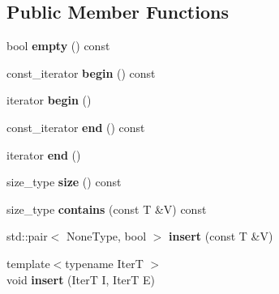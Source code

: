 \subsection*{Public Member Functions}
\begin{DoxyCompactItemize}
\item 
\hypertarget{classutil_1_1small__set_a2272cffd8ba98e11269718fe274482cf}{bool {\bfseries empty} () const }\label{classutil_1_1small__set_a2272cffd8ba98e11269718fe274482cf}

\item 
\hypertarget{classutil_1_1small__set_af4da233dcdf5e184c1a97f410b92fa6c}{const\+\_\+iterator {\bfseries begin} () const }\label{classutil_1_1small__set_af4da233dcdf5e184c1a97f410b92fa6c}

\item 
\hypertarget{classutil_1_1small__set_a825b210881040305859a6504b8770bb4}{iterator {\bfseries begin} ()}\label{classutil_1_1small__set_a825b210881040305859a6504b8770bb4}

\item 
\hypertarget{classutil_1_1small__set_a08e7d4d4897f4e96f3cb741b80bd02bc}{const\+\_\+iterator {\bfseries end} () const }\label{classutil_1_1small__set_a08e7d4d4897f4e96f3cb741b80bd02bc}

\item 
\hypertarget{classutil_1_1small__set_ab739363d0dbb33dd957291e50034ef11}{iterator {\bfseries end} ()}\label{classutil_1_1small__set_ab739363d0dbb33dd957291e50034ef11}

\item 
\hypertarget{classutil_1_1small__set_ab8326762cc9700099f26cd867c9702ce}{size\+\_\+type {\bfseries size} () const }\label{classutil_1_1small__set_ab8326762cc9700099f26cd867c9702ce}

\item 
\hypertarget{classutil_1_1small__set_a787ddf15981a3a1b8096151188f52a8f}{size\+\_\+type {\bfseries contains} (const T \&V) const }\label{classutil_1_1small__set_a787ddf15981a3a1b8096151188f52a8f}

\item 
\hypertarget{classutil_1_1small__set_aabec9357fbaa341c057f156d5e547f1b}{std\+::pair$<$ None\+Type, bool $>$ {\bfseries insert} (const T \&V)}\label{classutil_1_1small__set_aabec9357fbaa341c057f156d5e547f1b}

\item 
\hypertarget{classutil_1_1small__set_a09c39b3e5174c9147b2201fd1e15a7bd}{{\footnotesize template$<$typename Iter\+T $>$ }\\void {\bfseries insert} (Iter\+T I, Iter\+T E)}\label{classutil_1_1small__set_a09c39b3e5174c9147b2201fd1e15a7bd}


\end{DoxyCompactItemize}
